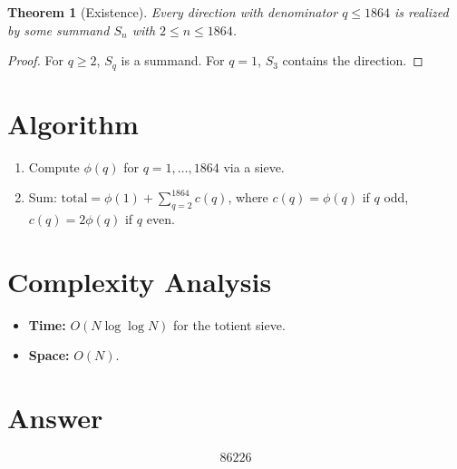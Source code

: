 \documentclass[12pt]{article}
\newtheorem{theorem}{Theorem}
\begin{document}
\begin{theorem}[Existence]
Every direction with denominator $q \leq 1864$ is realized by some summand $S_n$ with $2 \leq n \leq 1864$.
\end{theorem}
\begin{proof}
For $q \geq 2$, $S_q$ is a summand. For $q = 1$, $S_3$ contains the direction.
\end{proof}

\section{Algorithm}
\begin{enumerate}
\item Compute $\phi(q)$ for $q = 1, \ldots, 1864$ via a sieve.
\item Sum: $\text{total} = \phi(1) + \sum_{q=2}^{1864} c(q)$, where $c(q) = \phi(q)$ if $q$ odd, $c(q) = 2\phi(q)$ if $q$ even.
\end{enumerate}

\section{Complexity Analysis}
\begin{itemize}
\item \textbf{Time:} $O(N \log\log N)$ for the totient sieve.
\item \textbf{Space:} $O(N)$.
\end{itemize}

\section{Answer}

\[
\boxed{86226}
\]
\end{document}
